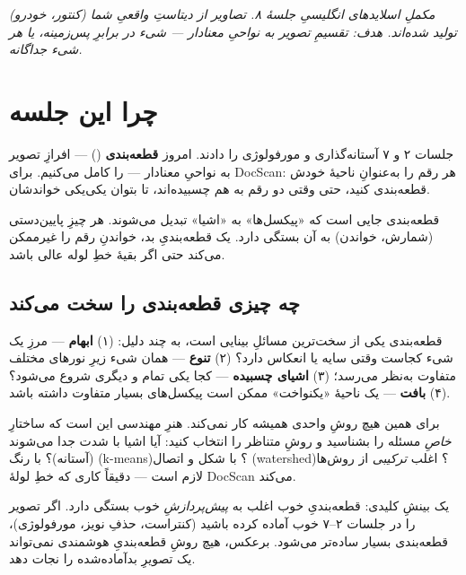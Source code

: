 \documentclass[12pt,a4paper]{article}
\begin{document}

{\small\itshape مکملِ اسلایدهای انگلیسیِ جلسهٔ ۸. تصاویر از دیتاستِ واقعیِ شما (کنتور، خودرو) تولید شده‌اند. هدف: تقسیمِ تصویر به نواحیِ معنادار — شیء در برابرِ پس‌زمینه، یا هر شیء جداگانه.}

\vspace{0.5cm}
\tableofcontents
\vspace{1cm}

\section{چرا این جلسه}

جلسات ۲ و ۷ آستانه‌گذاری و مورفولوژی را دادند. امروز \textbf{قطعه‌بندی} () —
افرازِ تصویر به نواحیِ معنادار — را کامل می‌کنیم. برای DocScan: هر رقم را به‌عنوانِ ناحیهٔ خودش
قطعه‌بندی کنید، حتی وقتی دو رقم به هم چسبیده‌اند، تا بتوان یکی‌یکی خواندشان.

\begin{nokte}
قطعه‌بندی جایی است که «پیکسل‌ها» به «اشیا» تبدیل می‌شوند. هر چیزِ پایین‌دستی (شمارش، خواندن) به آن
بستگی دارد. یک قطعه‌بندیِ بد، خواندنِ رقم را غیرممکن می‌کند حتی اگر بقیهٔ خطِ لوله عالی باشد.
\end{nokte}

\subsection{چه چیزی قطعه‌بندی را سخت می‌کند}

قطعه‌بندی یکی از سخت‌ترین مسائلِ بینایی است، به چند دلیل: (۱) \textbf{ابهام} — مرزِ یک شیء کجاست
وقتی سایه یا انعکاس دارد؟ (۲) \textbf{تنوع} — همان شیء زیرِ نورهای مختلف متفاوت به‌نظر می‌رسد؛
(۳) \textbf{اشیای چسبیده} — کجا یکی تمام و دیگری شروع می‌شود؟ (۴) \textbf{بافت} — یک ناحیهٔ
«یکنواخت» ممکن است پیکسل‌های بسیار متفاوت داشته باشد.

برای همین هیچ روشِ واحدی همیشه کار نمی‌کند. هنرِ مهندسی این است که ساختارِ \emph{خاصِ} مسئله را
بشناسید و روشِ متناظر را انتخاب کنید: آیا اشیا با شدت جدا می‌شوند (آستانه)؟ با رنگ (k-means)؟ با
شکل و اتصال (watershed)؟ اغلب \emph{ترکیبی} از روش‌ها لازم است — دقیقاً کاری که خطِ لولهٔ DocScan
می‌کند.

\begin{nokte}
یک بینشِ کلیدی: قطعه‌بندیِ خوب اغلب به \emph{پیش‌پردازشِ} خوب بستگی دارد. اگر تصویر را در جلسات
۲–۷ خوب آماده کرده باشید (کنتراست، حذفِ نویز، مورفولوژی)، قطعه‌بندی بسیار ساده‌تر می‌شود. برعکس،
هیچ روشِ قطعه‌بندیِ هوشمندی نمی‌تواند یک تصویرِ بد‌آماده‌شده را نجات دهد.
\end{nokte}
\end{document}
